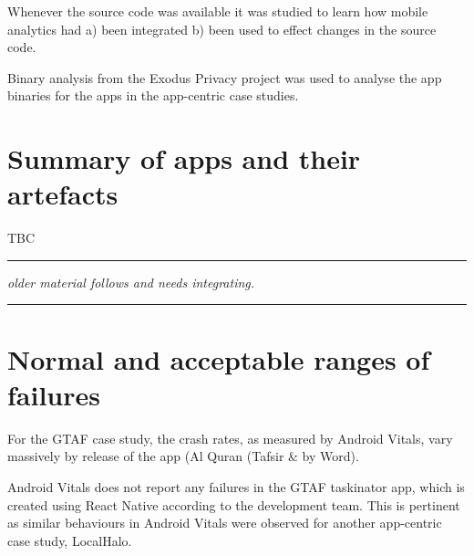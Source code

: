 Whenever the source code was available it was studied to learn how mobile analytics had a) been integrated b) been used to effect changes in the source code. 

Binary analysis from the Exodus Privacy project was used to analyse the app binaries for the apps in the app-centric case studies.

\section{Summary of apps and their artefacts}
TBC




\noindent\textcolor[RGB]{220,220,220}{\rule{\linewidth}{1pt}}
\emph{older material follows and needs integrating.}

\noindent\textcolor[RGB]{220,220,220}{\rule{\linewidth}{1pt}}


\section{Normal and acceptable ranges of failures}
For the GTAF case study, the crash rates, as measured by Android Vitals, vary massively by release of the app (Al Quran (Tafsir \& by Word). 

Android Vitals does not report any failures in the GTAF taskinator app, which is created using React Native according to the development team. This is pertinent as similar behaviours in Android Vitals were observed for another app-centric case study, LocalHalo. 

